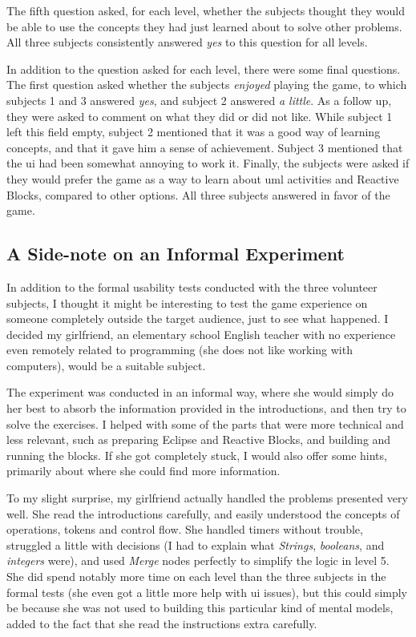 \noindent
The fifth question asked, for each level, whether the subjects thought they would be able to use the concepts they had just learned about to solve other problems. All three subjects consistently answered \emph{yes} to this question for all levels.

\noindent
In addition to the question asked for each level, there were some final questions. The first question asked whether the subjects \emph{enjoyed} playing the game, to which subjects 1 and 3 answered \emph{yes}, and subject 2 answered \emph{a little}. As a follow up, they were asked to comment on what they did or did not like. While subject 1 left this field empty, subject 2 mentioned that it was a good way of learning concepts, and that it gave him a sense of achievement. Subject 3 mentioned that the \gls{ui} had been somewhat annoying to work it. Finally, the subjects were asked if they would prefer the game as a way to learn about \gls{uml} activities and Reactive Blocks, compared to other options. All three subjects answered in favor of the game.

\subsection{A Side-note on an Informal Experiment}
\label{sec:game_testing_sidenote}
In addition to the formal usability tests conducted with the three volunteer subjects, I thought it might be interesting to test the game experience on someone completely outside the target audience, just to see what happened. I decided my girlfriend, an elementary school English teacher with no experience even remotely related to programming (she does not like working with computers), would be a suitable subject.

\noindent
The experiment was conducted in an informal way, where she would simply do her best to absorb the information provided in the introductions, and then try to solve the exercises. I helped with some of the parts that were more technical and less relevant, such as preparing Eclipse and Reactive Blocks, and building and running the blocks. If she got completely stuck, I would also offer some hints, primarily about where she could find more information.

\noindent
To my slight surprise, my girlfriend actually handled the problems presented very well. She read the introductions carefully, and easily understood the concepts of operations, tokens and control flow. She handled timers without trouble, struggled a little with decisions (I had to explain what \emph{Strings}, \emph{booleans}, and \emph{integers} were), and used \emph{Merge} nodes perfectly to simplify the logic in level 5. She did spend notably more time on each level than the three subjects in the formal tests (she even got a little more help with \gls{ui} issues), but this could simply be because she was not used to building this particular kind of mental models, added to the fact that she read the instructions extra carefully.

